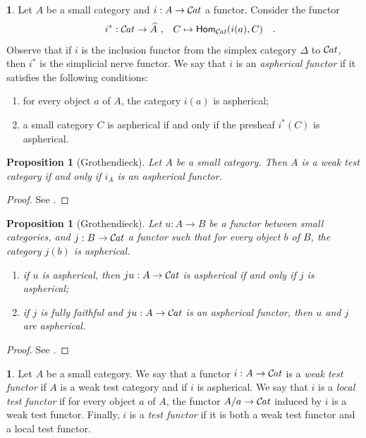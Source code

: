 \documentclass[10pt, english, a4paper, nothms]{amsart}
\theoremstyle{plain}
\newtheorem{prop}[theorem]{Proposition}
\theoremstyle{remark}
\theoremstyle{definition}
\newtheorem{paragr}[theorem]{}
\numberwithin{equation}{theorem}
\newcommand{\Cat}{{\mathcal{C}\mspace{-2.mu}\it{at}}}
\newcommand{\Hom}{\operatorname{\mathsf{Hom}}}
\newcommand{\pref}[1]{{\widehat{ #1 }}}
\newcommand{\tranche}[2]{#1/{#2}}
\newcommand{\mdvirg}{\text{ ,}\hspace{10pt}}
\newcommand\zbox[1]{\makebox[0pt][l]{#1}}
\newcommand\pbox[1]{\zbox{\quad #1}} %
\begin{document}
\begin{paragr}
Let $A$ be a small category and $i: A \to \Cat$ a functor. Consider
the functor 
\[
i^*: \Cat \to \pref{A} \mdvirg C \mapsto \Hom_\Cat(i(a),C) \pbox{.}
\]
Observe that if $i$ is the inclusion functor from the simplex category
$\Delta$ to $\Cat$, then $i^*$ is the simplicial nerve functor. We say
that $i$ is an \emph{aspherical functor} if it satisfies the following
conditions: 
\begin{enumerate}
\item for every object $a$ of $A$, the category $i(a)$ is aspherical;
\item a small category $C$ is aspherical if and only if the presheaf
$i^*(C)$ is aspherical.
\end{enumerate}
\end{paragr}

\begin{prop}[Grothendieck]
\label{prop:testFaiblei_AAspherique}
Let $A$ be a small category. Then $A$ is a weak test category if and only if
$i_A$ is an aspherical functor.
\end{prop}
\begin{proof}
See \cite[Remark 1.7.2]{maltsiniotis2005}.
\end{proof}

\begin{prop}[Grothendieck]\label{lemmeFoncteursAspheriquesTriCommutatif}
Let $u: A \to B$ be a functor between small categories, and $j: B \to \Cat$ a
functor such that for every object $b$ of $B$, the category $j(b)$ is
aspherical.
\begin{enumerate}
\item if $u$ is aspherical, then $ju: A \to \Cat$ is aspherical if
and only if $j$ is aspherical;
\item if $j$ is fully faithful and $ju: A \to \Cat$ is an aspherical functor, then
$u$ and $j$ are aspherical.
\end{enumerate}
\end{prop}
\begin{proof}
See \cite[Lemma 1.7.4]{pursuingstacks}.
\end{proof}

\begin{paragr}
Let $A$ be a small category. We say that a functor $i: A \to \Cat$ is
a \emph{weak test functor} if $A$ is a weak test category and if $i$ is
aspherical. We say that $i$ is a \emph{local test functor} if for every
object $a$ of $A$, the functor $\tranche{A}{a}\to\Cat$ induced by $i$
is a weak test functor. Finally, $i$ is a \emph{test functor} if it is
both a weak test functor and a local test functor. 
\end{paragr}
\end{document}
